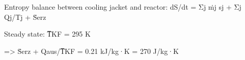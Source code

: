 Entropy balance between cooling jacket and reactor:  
dS/dt = Σj ṁj sj + Σj Qj/Tj + Ṡerz  

Steady state:  
T̅KF = 295 K  

=> Ṡerz + Qaus/T̅KF = 0.21 kJ/kg·K = 270 J/kg·K